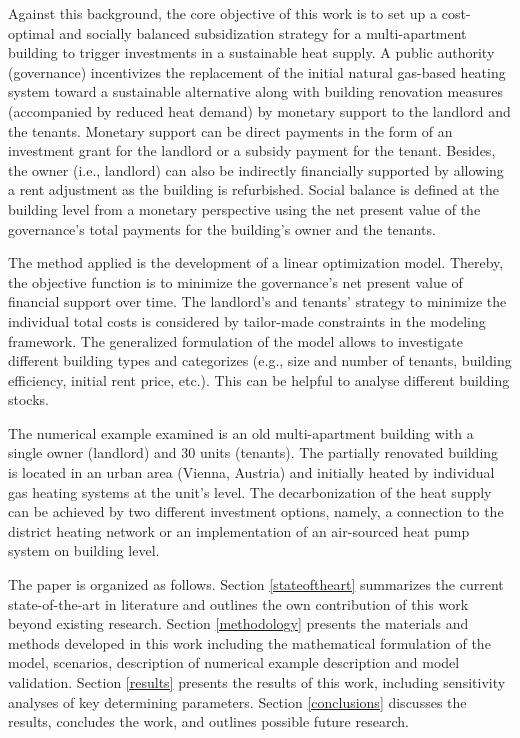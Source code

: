 Against this background, the core objective of this work is to set up a cost-optimal and socially balanced subsidization strategy for a multi-apartment building to trigger investments in a sustainable heat supply. A public authority (governance) incentivizes the replacement of the initial natural gas-based heating system toward a sustainable alternative along with building renovation measures (accompanied by reduced heat demand) by monetary support to the landlord and the tenants. Monetary support can be direct payments in the form of an investment grant for the landlord or a subsidy payment for the tenant. Besides, the owner (i.e., landlord) can also be indirectly financially supported by allowing a rent adjustment as the building is refurbished. Social balance is defined at the building level from a monetary perspective using the net present value of the governance's total payments for the building's owner and the tenants.\vspace{0.5cm}

The method applied is the development of a linear optimization model. Thereby, the objective function is to minimize the governance's net present value of financial support over time. The landlord's and tenants' strategy to minimize the individual total costs is considered by tailor-made constraints in the modeling framework. The generalized formulation of the model allows to investigate different building types and categorizes (e.g., size and number of tenants, building efficiency, initial rent price, etc.). This can be helpful to analyse different building stocks.\vspace{0.5cm}

The numerical example examined is an old multi-apartment building with a single owner (landlord) and 30 units (tenants). The partially renovated building is located in an urban area (Vienna, Austria) and initially heated by individual gas heating systems at the unit's level. The decarbonization of the heat supply can be achieved by two different investment options, namely, a connection to the district heating network or an implementation of an air-sourced heat pump system on building level.\vspace{0.5cm}

The paper is organized as follows. Section \ref{stateoftheart} summarizes the current state-of-the-art in literature and outlines the own contribution of this work beyond existing research. Section \ref{methodology} presents the materials and methods developed in this work including the mathematical formulation of the model, scenarios, description of numerical example description and model validation. Section \ref{results} presents the results of this work, including sensitivity analyses of key determining parameters. Section \ref{conclusions} discusses the results, concludes the work, and outlines possible future research.
